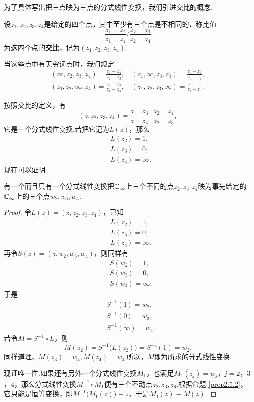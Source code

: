 为了具体写出把三点映为三点的分式线性变换，我们引进交比的概念.
\begin{definition}\label{def2.5.3}
  设$z_1,z_2,z_3,z_4$是给定的四个点，其中至少有三个点是不相同的，称比值
  \[
    \frac{z_1-z_3}{z_1-z_4} \bigg/ \frac{z_2-z_3}{z_2-z_4}
  \]
  为这四个点的\textbf{交比}，记为$(z_1,z_2,z_3,z_4)$.
\end{definition}
  当这些点中有无穷远点时，我们规定
  \begin{gather*}
    (\infty,z_2,z_3,z_4) = \frac{z_2-z_4}{z_2-z_3}, \quad
    (z_1,\infty,z_3,z_4) = \frac{z_1-z_3}{z_1-z_4}, \\
    (z_1,z_2,\infty,z_4) = \frac{z_2-z_4}{z_1-z_4}, \quad
    (z_1,z_2,z_3,\infty) = \frac{z_1-z_3}{z_2-z_3}.
  \end{gather*}

按照交比的定义，有
\[
  (z,z_2,z_3,z_4) = \frac{z-z_3}{z-z_4} \cdot \frac{z_2-z_4}{z_2-z_3},
\]
它是一个分式线性变换.若把它记为$L(z)$，那么
\begin{align*}
  & L(z_2) = 1,\\
  & L(z_3) = 0,\\
  & L(z_4) = \infty.
\end{align*}
现在可以证明
\begin{theorem}\label{thm2.5.4}
  有一个而且只有一个分式线性变换把$\mathbb C_\infty$上三个不同的点$z_2,z_3,z_4$映为事先给定的$\mathbb C_\infty$上的三个点$w_2,w_3,w_4$.
\end{theorem}
\begin{proof}
  令$L(z)=(z,z_2,z_3,z_4)$，已知
  \begin{equation}\label{eq2.5.2}
    \begin{aligned}
    & L(z_2) = 1,\\
    & L(z_3) = 0,\\
    & L(z_4) = \infty.
    \end{aligned}
  \end{equation}
  再令$S(z)=(z,w_2,w_3,w_4)$，则同样有
  \begin{equation*}
    \begin{aligned}
    & S(w_2) = 1,\\
    & S(w_3 )= 0,\\
    & S(w_4) = \infty.
    \end{aligned}
  \end{equation*}
  于是
  \begin{equation*}
    \begin{aligned}
      & S^{-1}(1) = w_2,\\
      & S^{-1}(0) = w_3,\\
      & S^{-1}(\infty) = w_4.
    \end{aligned}
  \end{equation*}
  若令$M=S^{-1}\circ L$，则
  \[
    M(z_2) = S^{-1}\big(L(z_2)\big) = S^{-1}(1) = w_2.
  \]
  同样道理，$M(z_3)=w_3,M(z_4)=w_4$.所以，$M$即为所求的分式线性变换.

  现证唯一性.如果还有另外一个分式线性变换$M_1$，也满足$M_1(z_j)=w_j$，$j=2$，$3$，$4$，那么分式线性变换$M^{-1}\circ M_1$便有三个不动点$z_2,z_3,z_4$.根据命题  \ref{prop2.5.2}，它只能是恒等变换，即$M^{-1}\big(M_1(z)\big)\equiv z$，于是$M_1(z)\equiv M(z)$.
\end{proof}

